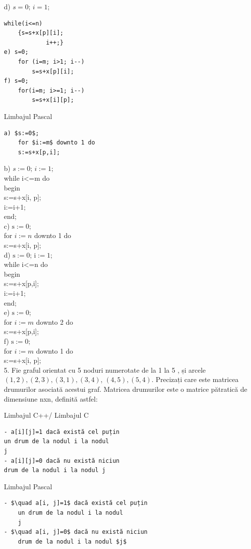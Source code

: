\documentclass[10pt]{article}
\begin{document}
d) $s=0$; $i=1$;

\begin{verbatim}
while(i<=n)
    {s=s+x[p][i];
            i++;}
e) s=0;
    for (i=m; i>1; i--)
        s=s+x[p][i];
f) s=0;
    for(i=m; i>=1; i--)
        s=s+x[i][p];
\end{verbatim}

Limbajul Pascal

\begin{verbatim}
a) $s:=0$;
    for $i:=m$ downto 1 do
    s:=s+x[p,i];
\end{verbatim}

b) $s:=0$; $i:=1$;\\
while i<=m do\\
begin\\[0pt]
s:=s+x[i, p];\\
i:=i+1;\\
end;\\
c) $\mathrm{s}:=0$;\\
for $i:=n$ downto 1 do\\[0pt]
s:=s+x[i, p];\\
d) $\mathrm{s}:=0$; $\mathrm{i}:=1$;\\
while i<=n do\\
begin\\[0pt]
s:=s+x[p,i];\\
i:=i+1;\\
end;\\
e) $\mathrm{s}:=0$;\\
for $i:=m$ downto 2 do\\[0pt]
s:=s+x[p,i];\\
f) $\mathrm{s}:=0$;\\
for $i:=m$ downto 1 do\\[0pt]
s:=s+x[i, p];\\
5. Fie graful orientat cu 5 noduri numerotate de la 1 la 5 , și arcele $(1,2),(2,3),(3,1),(3,4)$, $(4,5),(5,4)$. Precizați care este matricea drumurilor asociată acestui graf. Matricea drumurilor este o matrice pătratică de dimensiune nxn, definită astfel:

Limbajul C++/ Limbajul C

\begin{verbatim}
- a[i][j]=1 dacă există cel puțin
un drum de la nodul i la nodul
j
- a[i][j]=0 dacă nu există niciun
drum de la nodul i la nodul j
\end{verbatim}

Limbajul Pascal

\begin{verbatim}
- $\quad a[i, j]=1$ dacă există cel puțin
    un drum de la nodul i la nodul
    j
- $\quad a[i, j]=0$ dacă nu există niciun
    drum de la nodul i la nodul $j$
\end{verbatim}
\end{document}
